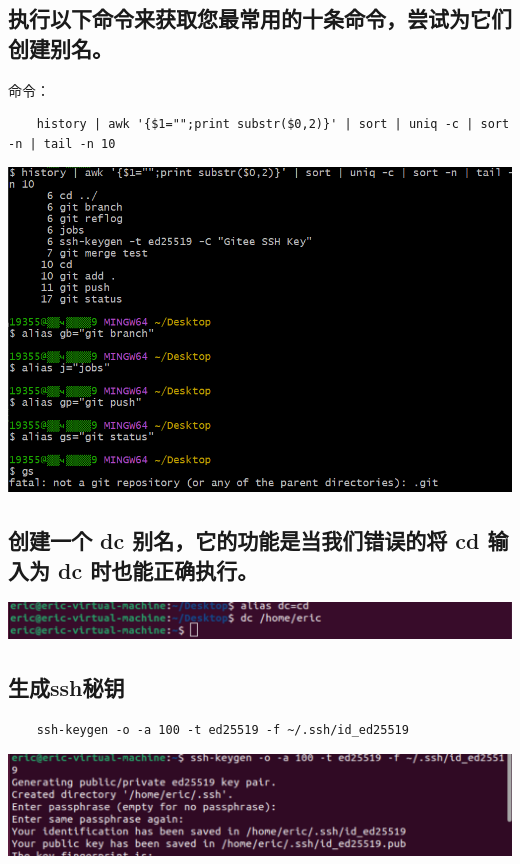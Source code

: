 \documentclass[UTF8,a4paper]{ctexart}
\begin{document}
\subsection{执行以下命令来获取您最常用的十条命令，尝试为它们创建别名。}
命令：
\begin{lstlisting}
    history | awk '{$1="";print substr($0,2)}' | sort | uniq -c | sort -n | tail -n 10 
\end{lstlisting}
\begin{table}[H]
\includegraphics[width=1\textwidth]{./命令行/别名2.png}
\end{table}

\subsection{创建一个 dc 别名，它的功能是当我们错误的将 cd 输入为 dc 时也能正确执行。}
\begin{table}[H]
    \includegraphics[width=1\textwidth]{./命令行/别名3.png}
\end{table}

\subsection{生成ssh秘钥}
\begin{lstlisting}
    ssh-keygen -o -a 100 -t ed25519 -f ~/.ssh/id_ed25519
\end{lstlisting}
\includegraphics[width=1\textwidth]{./命令行/ssh1.png}
\end{document}
